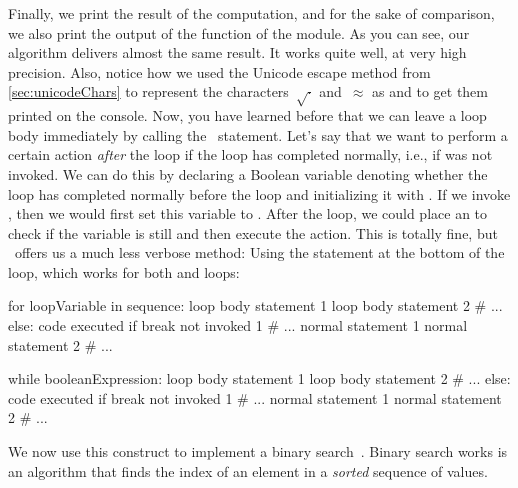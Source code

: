 Finally, we print the result of the computation, and for the sake of comparison, we also print the output of the  function of the  module.
As you can see, our algorithm delivers almost the same result.
It works quite well, at very high precision.
Also, notice how we used the Unicode escape method from \cref{sec:unicodeChars} to represent the characters~$\sqrt{\cdot}$ and~$\approx$ as  and  to get them printed on the console.%
%
\FloatBarrier%
\endhsection%
%
%
%
\label{sec:loopElse}%
%
Now, you have learned before that we can leave a loop body immediately by calling the~ statement.
Let's say that we want to perform a certain action \emph{after} the loop if the loop has completed normally, i.e., if  was not invoked.
We can do this by declaring a Boolean variable denoting whether the loop has completed normally before the loop and initializing it with .
If we invoke , then we would first set this variable to .
After the loop, we could place an  to check if the variable is still  and then execute the action.
This is totally fine, but \python\ offers us a much less verbose method:
Using the  statement at the bottom of the loop, which works for both  and  loops:%
%
\begin{pythonSyntax}
for loopVariable in sequence:
    loop body statement 1
    loop body statement 2
    # ...
else:
    code executed if break not invoked 1
    # ...
normal statement 1
normal statement 2
# ...
\end{pythonSyntax}
%
\begin{pythonSyntax}
while booleanExpression:
    loop body statement 1
    loop body statement 2
    # ...
else:
    code executed if break not invoked 1
    # ...
normal statement 1
normal statement 2
# ...
\end{pythonSyntax}
%
%
%
%
We now use this construct to implement a binary search~\cite{K1998SAS,H2024POIC:BS,B1999PP}.
Binary search works is an algorithm that finds the index of an element in a \emph{sorted} sequence  of values.
